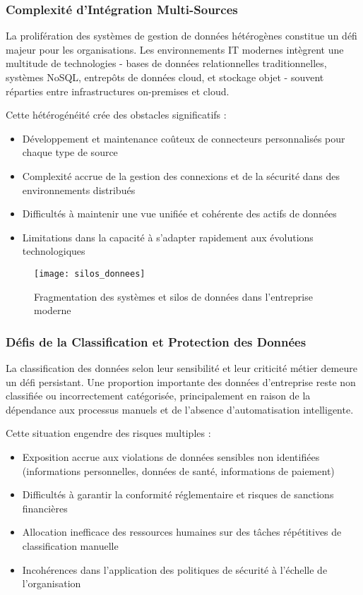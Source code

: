 \subsubsection{Complexité d'Intégration Multi-Sources}

La prolifération des systèmes de gestion de données hétérogènes constitue un défi majeur pour les organisations. Les environnements IT modernes intègrent une multitude de technologies - bases de données relationnelles traditionnelles, systèmes NoSQL, entrepôts de données cloud, et stockage objet - souvent réparties entre infrastructures on-premises et cloud.

Cette hétérogénéité crée des obstacles significatifs :
\begin{itemize}
    \item Développement et maintenance coûteux de connecteurs personnalisés pour chaque type de source
    \item Complexité accrue de la gestion des connexions et de la sécurité dans des environnements distribués
    \item Difficultés à maintenir une vue unifiée et cohérente des actifs de données
    \item Limitations dans la capacité à s'adapter rapidement aux évolutions technologiques
\end{itemize}

\begin{figure}[htpb]
\centering
\texttt{[image: silos\_donnees]}
\caption{Fragmentation des systèmes et silos de données dans l'entreprise moderne}
\label{fig:silos_donnees}
\end{figure}

\subsubsection{Défis de la Classification et Protection des Données}

La classification des données selon leur sensibilité et leur criticité métier demeure un défi persistant. Une proportion importante des données d'entreprise reste non classifiée ou incorrectement catégorisée, principalement en raison de la dépendance aux processus manuels et de l'absence d'automatisation intelligente.

Cette situation engendre des risques multiples :
\begin{itemize}
    \item Exposition accrue aux violations de données sensibles non identifiées (informations personnelles, données de santé, informations de paiement)
    \item Difficultés à garantir la conformité réglementaire et risques de sanctions financières
    \item Allocation inefficace des ressources humaines sur des tâches répétitives de classification manuelle
    \item Incohérences dans l'application des politiques de sécurité à l'échelle de l'organisation
\end{itemize}


